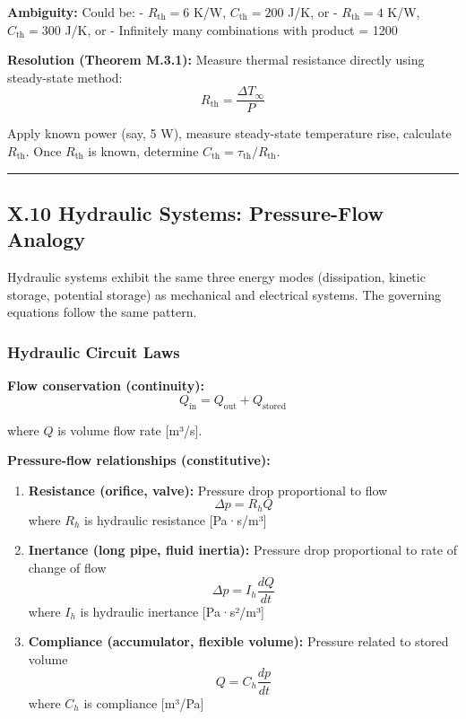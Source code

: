 \documentclass[
]{article}
\begin{document}
\textbf{Ambiguity:} Could be: - \(R_{\text{th}} = 6\) K/W,
\(C_{\text{th}} = 200\) J/K, or - \(R_{\text{th}} = 4\) K/W,
\(C_{\text{th}} = 300\) J/K, or - Infinitely many combinations with
product = 1200

\textbf{Resolution (Theorem M.3.1):} Measure thermal resistance directly
using steady-state method:
\[R_{\text{th}} = \frac{\Delta T_{\infty}}{P}\]

Apply known power (say, 5 W), measure steady-state temperature rise,
calculate \(R_{\text{th}}\). Once \(R_{\text{th}}\) is known, determine
\(C_{\text{th}} = \tau_{\text{th}} / R_{\text{th}}\).

\begin{center}\rule{0.5\linewidth}{0.5pt}\end{center}

\subsection{X.10 Hydraulic Systems: Pressure-Flow
Analogy}\label{x.10-hydraulic-systems-pressure-flow-analogy}

Hydraulic systems exhibit the same three energy modes (dissipation,
kinetic storage, potential storage) as mechanical and electrical
systems. The governing equations follow the same pattern.

\subsubsection{Hydraulic Circuit Laws}\label{hydraulic-circuit-laws}

\textbf{Flow conservation (continuity):}
\[Q_{\text{in}} = Q_{\text{out}} + Q_{\text{stored}}\]

where \(Q\) is volume flow rate {[}m³/s{]}.

\textbf{Pressure-flow relationships (constitutive):}

\begin{enumerate}
\def\labelenumi{\arabic{enumi}.}
\item
  \textbf{Resistance (orifice, valve):} Pressure drop proportional to
  flow \[\Delta p = R_h Q\] where \(R_h\) is hydraulic resistance
  {[}Pa·s/m³{]}
\item
  \textbf{Inertance (long pipe, fluid inertia):} Pressure drop
  proportional to rate of change of flow
  \[\Delta p = I_h \frac{dQ}{dt}\] where \(I_h\) is hydraulic inertance
  {[}Pa·s²/m³{]}
\item
  \textbf{Compliance (accumulator, flexible volume):} Pressure related
  to stored volume \[Q = C_h \frac{dp}{dt}\] where \(C_h\) is compliance
  {[}m³/Pa{]}
\end{enumerate}
\end{document}

